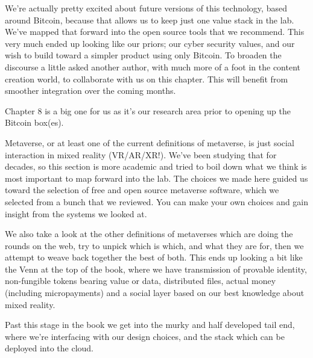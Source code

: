 We’re actually pretty excited about future versions of this technology, based around Bitcoin, because that allows us to keep just one value stack in the lab. We’ve mapped that forward into the open source tools that we recommend. This very much ended up looking like our priors; our cyber security values, and our wish to build toward a simpler product using only Bitcoin. To broaden the discourse a little asked another author, with much more of a foot in the content creation world, to collaborate with us on this chapter. This will benefit from smoother integration over the coming months.\par
Chapter 8 is a big one for us as it’s our research area prior to opening up the Bitcoin box(es).\par Metaverse, or at least one of the current definitions of metaverse, is just social interaction in mixed reality (VR/AR/XR!). We’ve been studying that for decades, so this section is more academic and tried to boil down what we think is most important to map forward into the lab. The choices we made here guided us toward the selection of free and open source metaverse software, which we selected from a bunch that we reviewed. You can make your own choices and gain insight from the systems we looked at.\par
We also take a look at the other definitions of metaverses which are doing the rounds on the web, try to unpick which is which, and what they are for, then we attempt to weave back together the best of both. This ends up looking a bit like the Venn at the top of the book, where we have transmission of provable identity, non-fungible tokens bearing value or data, distributed files, actual money (including micropayments) and a social layer based on our best knowledge about mixed reality.\par
Past this stage in the book we get into the murky and half developed tail end, where we’re interfacing with our design choices, and the stack which can be deployed into the cloud.


